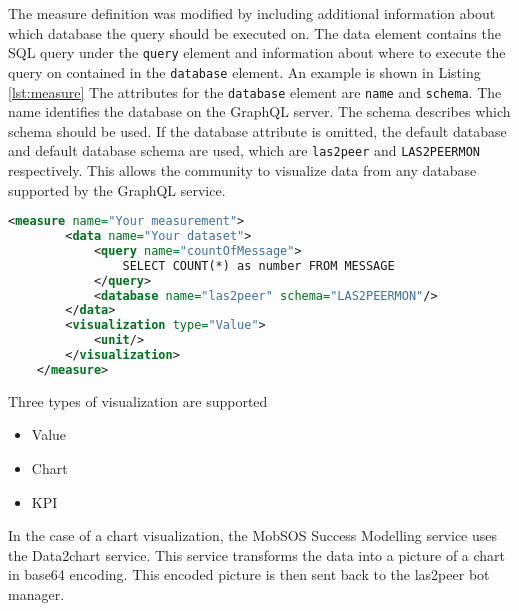 The measure definition was modified by including additional information about which database the query should be executed on. The data element contains the SQL query under the \texttt{query} element and information about where to execute the query on contained in the \texttt{database} element. An example is shown in Listing \ref{lst:measure}
The attributes for the \texttt{database} element are \texttt{name} and \texttt{schema}. The name identifies the database on the GraphQL server. The schema describes which schema should be used.
If the database attribute is omitted, the default database and default database schema are used, which are \texttt{las2peer} and \texttt{LAS2PEERMON} respectively.
This allows the community to visualize data from any database supported by the GraphQL service.


\begin{lstlisting}[language=XML, caption= example of a Measure, label=lst:measure]
    <measure name="Your measurement">
        <data name="Your dataset">
            <query name="countOfMessage">
                SELECT COUNT(*) as number FROM MESSAGE
            </query>
            <database name="las2peer" schema="LAS2PEERMON"/>
        </data>
        <visualization type="Value">
            <unit/>
        </visualization>
    </measure>
    \end{lstlisting}

Three types of visualization are supported
\begin{itemize}
    \item Value
    \item Chart
    \item KPI
\end{itemize}
In the case of a chart visualization, the MobSOS Success Modelling service uses the Data2chart service. This service transforms the data into a picture of a chart in base64 encoding. This encoded picture is then sent back to the las2peer bot manager.

